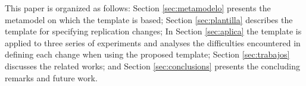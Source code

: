This paper is organized as follows: Section \ref{sec:metamodelo} presents the metamodel on which the template is based; Section \ref{sec:plantilla} describes the template for specifying replication changes; In Section \ref{sec:aplica} the template is applied to three series of experiments and analyses the difficulties encountered in defining each change when using the proposed template; Section \ref{sec:trabajos} discusses the related works; and Section \ref{sec:conclusions} presents the concluding remarks and future work.




 


